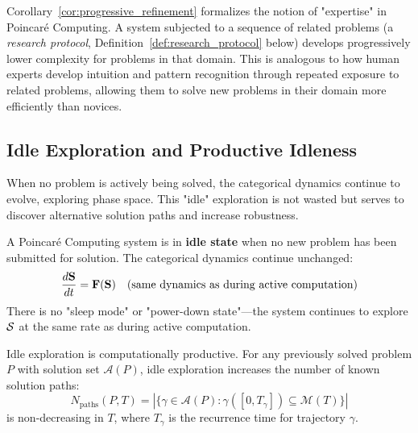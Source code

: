 \begin{remark}
\label{rem:expertise}
Corollary~\ref{cor:progressive_refinement} formalizes the notion of "expertise" in Poincaré Computing. A system subjected to a sequence of related problems (a \textit{research protocol}, Definition~\ref{def:research_protocol} below) develops progressively lower complexity for problems in that domain. This is analogous to how human experts develop intuition and pattern recognition through repeated exposure to related problems, allowing them to solve new problems in their domain more efficiently than novices.
\end{remark}

\subsection{Idle Exploration and Productive Idleness}

When no problem is actively being solved, the categorical dynamics continue to evolve, exploring phase space. This "idle" exploration is not wasted but serves to discover alternative solution paths and increase robustness.

\begin{definition}
\label{def:idle_state}
A Poincaré Computing system is in \textbf{idle state} when no new problem has been submitted for solution. The categorical dynamics continue unchanged:
\begin{equation}
\frac{d\mathbf{S}}{dt} = \mathbf{F}(\mathbf{S}) \quad \text{(same dynamics as during active computation)}
\label{eq:idle_dynamics}
\end{equation}
There is no "sleep mode" or "power-down state"—the system continues to explore $\mathcal{S}$ at the same rate as during active computation.
\end{definition}

\begin{theorem}
\label{thm:productive_idleness}
Idle exploration is computationally productive. For any previously solved problem $P$ with solution set $\mathcal{A}(P)$, idle exploration increases the number of known solution paths:
\begin{equation}
N_{\text{paths}}(P, T) = |\{\gamma \in \mathcal{A}(P) : \gamma([0, T_\gamma]) \subseteq \mathcal{M}(T)\}|
\label{eq:known_paths}
\end{equation}
is non-decreasing in $T$, where $T_\gamma$ is the recurrence time for trajectory $\gamma$.
\end{theorem}

